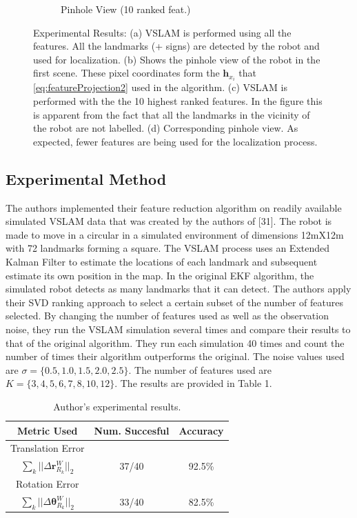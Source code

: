 \documentclass[10pt,twocolumn,letterpaper]{article}
\begin{document}
\begin{figure}[t!]
\begin{subfigure}[b]{0.25\textwidth}
                \caption{Pinhole View (10 ranked feat.)}
                \label{fig:mouse}
        \end{subfigure}
        \caption{Experimental Results: (a) VSLAM is performed using all the features. All the landmarks (+ signs) are detected by the robot and used for localization. (b) Shows the pinhole view of the robot in the first scene. These pixel coordinates form the $\boldsymbol{h}_{x_i}$ that \eqref{eq:featureProjection2} used in the algorithm. (c) VSLAM is performed with the the 10 highest ranked features. In the figure this is apparent from the fact that all the landmarks in the vicinity of the robot are not labelled. (d) Corresponding pinhole view. As expected, fewer features are being used for the localization process.}
\label{fig:animals}
\end{figure}

\subsection{Experimental Method}
The authors implemented their feature reduction algorithm on readily 
available simulated VSLAM data that was created by the authors of 
[31]. 
The robot is made to move in a circular in a simulated environment of dimensions 12mX12m with 72 
landmarks forming a square. The VSLAM process uses an Extended Kalman Filter to estimate the locations 
of each landmark and subsequent estimate its own position in the map. In the original EKF algorithm, the 
simulated robot detects as many landmarks that it can detect. The authors apply their SVD ranking approach
 to select a certain subset of the number of features selected. By changing the number of features used as 
 well as the observation noise, they run the VSLAM simulation several times and compare their results to 
 that of the original algorithm. They run each simulation 40 times and count the number of times their 
 algorithm outperforms the original. The noise values used are $\sigma=\{0.5, 1.0, 1.5, 2.0, 2.5\} $. 
The number of features used are $ K = \{ 3, 4, 5, 6, 7, 8, 10, 12 \}$. 
The results are provided in Table 1. 
\begin{table}[h]
\begin{center}
\begin{tabular}{|c|c|c|}
\hline
Metric Used & Num. Succesful & Accuracy  \\
\hline
 Translation Error &   &   \\
$ \sum_k || \Delta \boldsymbol{r}_{R_k}^W ||_2 $ & 37/40 & 92.5\% \\ 
\hline
Rotation Error &   &   \\
$ \sum_k || \Delta \boldsymbol{\theta}_{R_k}^W ||_2 $ & 33/40 & 82.5\% \\
\hline
\end{tabular}
\end{center}
\caption{Author's experimental results.}
\end{table}
\end{document}
